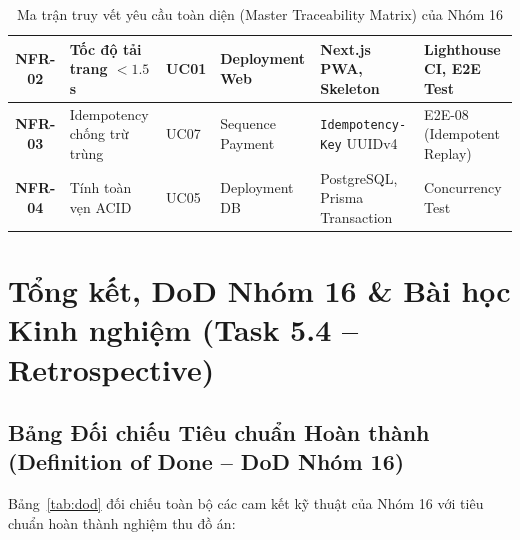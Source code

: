 \documentclass[a4paper]{article}
\begin{document}
\begin{table}[H]
\begin{tabular}{|c|>{\raggedright\arraybackslash}p{2.4cm}|>{\raggedright\arraybackslash}p{2.2cm}|>{\raggedright\arraybackslash}p{2.4cm}|>{\raggedright\arraybackslash}p{3.2cm}|>{\raggedright\arraybackslash}p{2.6cm}|}
\textbf{NFR-02} & Tốc độ tải trang $<1.5$s & UC01 & Deployment Web & Next.js PWA, Skeleton & Lighthouse CI, E2E Test \\ \hline
\textbf{NFR-03} & Idempotency chống trừ trùng & UC07 & Sequence Payment & \texttt{Idempotency-Key} UUIDv4 & E2E-08 (Idempotent Replay) \\ \hline
\textbf{NFR-04} & Tính toàn vẹn ACID & UC05 & Deployment DB & PostgreSQL, Prisma Transaction & Concurrency Test \\ \hline
\end{tabular}
\caption{Ma trận truy vết yêu cầu toàn diện (Master Traceability Matrix) của Nhóm 16}
\label{tab:master_traceability}
\end{table}

\newpage
\section{Tổng kết, DoD Nhóm 16 \& Bài học Kinh nghiệm (Task 5.4 -- Retrospective)}

\subsection{Bảng Đối chiếu Tiêu chuẩn Hoàn thành (Definition of Done -- DoD Nhóm 16)}
Bảng~\ref{tab:dod} đối chiếu toàn bộ các cam kết kỹ thuật của Nhóm 16 với tiêu chuẩn hoàn thành nghiệm thu đồ án:
\end{document}
